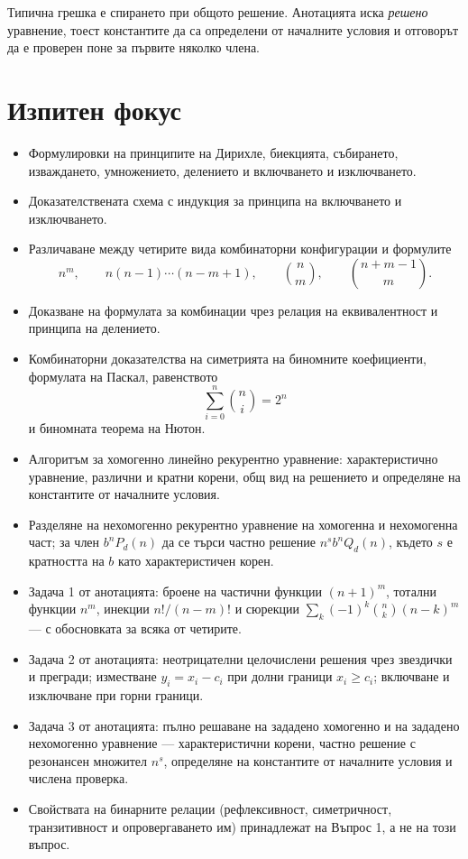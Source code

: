 \begin{remark}
Типична грешка е спирането при общото решение. Анотацията иска \emph{решено}
уравнение, тоест константите да са определени от началните условия и отговорът
да е проверен поне за първите няколко члена.
\end{remark}

\section{Изпитен фокус}\label{s:2.6}

\begin{itemize}
\item Формулировки на принципите на Дирихле, биекцията, събирането, изваждането, умножението, делението и включването и изключването.
\item Доказателствената схема с индукция за принципа на включването и изключването.
\item Различаване между четирите вида комбинаторни конфигурации и формулите
\[
n^m,\qquad n(n-1)\cdots(n-m+1),\qquad
\binom{n}{m},\qquad \binom{n+m-1}{m}.
\]
\item Доказване на формулата за комбинации чрез релация на еквивалентност и принципа на делението.
\item Комбинаторни доказателства на симетрията на биномните коефициенти, формулата на Паскал, равенството
\[
\sum_{i=0}^{n}\binom{n}{i}=2^n
\]
и биномната теорема на Нютон.
\item Алгоритъм за хомогенно линейно рекурентно уравнение: характеристично уравнение, различни и кратни корени, общ вид на решението и определяне на константите от началните условия.
\item Разделяне на нехомогенно рекурентно уравнение на хомогенна и нехомогенна част; за член $b^nP_d(n)$ да се търси частно решение $n^sb^nQ_d(n)$, където $s$ е кратността на $b$ като характеристичен корен.
\item Задача 1 от анотацията: броене на частични функции $(n+1)^m$, тотални функции $n^m$, инекции $n!/(n-m)!$ и сюрекции $\sum_k(-1)^k\binom{n}{k}(n-k)^m$ --- с обосновката за всяка от четирите.
\item Задача 2 от анотацията: неотрицателни целочислени решения чрез звездички и прегради; изместване $y_i=x_i-c_i$ при долни граници $x_i\geq c_i$; включване и изключване при горни граници.
\item Задача 3 от анотацията: пълно решаване на зададено хомогенно и на зададено нехомогенно уравнение --- характеристични корени, частно решение с резонансен множител $n^s$, определяне на константите от началните условия и числена проверка.
\item Свойствата на бинарните релации (рефлексивност, симетричност, транзитивност и опровергаването им) принадлежат на Въпрос 1, а не на този въпрос.
\end{itemize}
